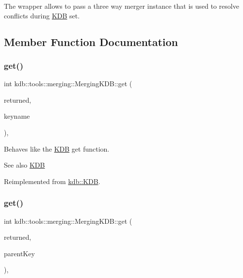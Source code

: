 The wrapper allows to pass a three way merger instance that is used to resolve conflicts during \mbox{\hyperlink{classkdb_1_1KDB}{K\+DB}} set. 

\subsection{Member Function Documentation}
\mbox{\label{classkdb_1_1tools_1_1merging_1_1MergingKDB_a0d2a28f24aeb6ba3e81af73ef8b98df7}} 
\subsubsection{\texorpdfstring{get()}{get()}\hspace{0.1cm}{\footnotesize\ttfamily [1/2]}}
{\footnotesize\ttfamily int kdb\+::tools\+::merging\+::\+Merging\+K\+D\+B\+::get (\begin{DoxyParamCaption}\item[{\mbox{\hyperlink{classkdb_1_1KeySet}{Key\+Set}} \&}]{returned,  }\item[{std\+::string const \&}]{keyname }\end{DoxyParamCaption})\hspace{0.3cm}{\ttfamily [override]}, {\ttfamily [virtual]}}



Behaves like the \mbox{\hyperlink{classkdb_1_1KDB}{K\+DB}} get function. 

\begin{DoxySeeAlso}{See also}
\mbox{\hyperlink{classkdb_1_1KDB}{K\+DB}} 
\end{DoxySeeAlso}


Reimplemented from \mbox{\hyperlink{classkdb_1_1KDB_a0419ffbc273c89756bc523b4223ec25a}{kdb\+::\+K\+DB}}.

\mbox{\label{classkdb_1_1tools_1_1merging_1_1MergingKDB_a062b1dac733aa3999691f8d70635b09c}} 
\subsubsection{\texorpdfstring{get()}{get()}\hspace{0.1cm}{\footnotesize\ttfamily [2/2]}}
{\footnotesize\ttfamily int kdb\+::tools\+::merging\+::\+Merging\+K\+D\+B\+::get (\begin{DoxyParamCaption}\item[{\mbox{\hyperlink{classkdb_1_1KeySet}{Key\+Set}} \&}]{returned,  }\item[{\mbox{\hyperlink{classkdb_1_1Key}{Key}} \&}]{parent\+Key }\end{DoxyParamCaption})\hspace{0.3cm}{\ttfamily [override]}, {\ttfamily [virtual]}}



